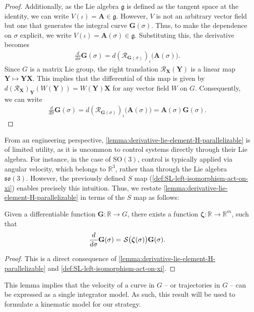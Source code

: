 \begin{proof}
    Additionally, as the Lie algebra $\mathfrak{g}$ is defined as the tangent space at the identity, we can write $V(\iota) = \mathbf{A} \in \mathfrak{g}$. However, $V$ is not an arbitrary vector field but one that generates the integral curve $\mathbf{G}(\sigma)$. Thus, to make the dependence on $\sigma$ explicit, we write $V(\iota) = \mathbf{A}(\sigma) \in \mathfrak{g}$. Substituting this, the derivative becomes
    \begin{align}
        \frac{d}{d\sigma} \mathbf{G}(\sigma) = d(\mathcal{R}_{\mathbf{G}(\sigma)})_{\iota}\bigl(\mathbf{A}(\sigma)\bigr).
    \end{align}
    Since $G$ is a matrix Lie group, the right translation $\mathcal{R}_\mathbf{X}(\mathbf{Y})$ is a linear map $\mathbf{Y}\mapsto \mathbf{Y}\mathbf{X}$. This implies that the differential of this map is given by $d(\mathcal{R}_\mathbf{X})_{\mathbf{Y}}(W(\mathbf{Y})) = W(\mathbf{Y})\mathbf{X}$ \citep[p. 194]{Lee2012} for any vector field $W$ on $G$. Consequently, we can write
    \begin{align}
        \frac{d}{d\sigma} \mathbf{G}(\sigma) = d(\mathcal{R}_{\mathbf{G}(\sigma)})_{\iota}\bigl(\mathbf{A}(\sigma)\bigr) = \mathbf{A}(\sigma)\mathbf{G}(\sigma).
    \end{align}
\end{proof}

From an engineering perspective, \cref{lemma:derivative-lie-element-H-parallelizable} is of limited utility, as it is uncommon to control systems directly through their Lie algebra. For instance, in the case of $\text{SO}(3)$, control is typically applied via angular velocity, which belongs to $\mathbb{R}^3$, rather than through the Lie algebra $\mathfrak{so}(3)$. However, the previously defined $S$ map (\cref{def:SL-left-isomorphism-act-on-xi}) enables precisely this intuition. Thus, we restate \cref{lemma:derivative-lie-element-H-parallelizable} in terms of the $S$ map as follows:
\begin{lemma} \label{lemma:very-important-fact}
    Given a differentiable function $\mathbf{\mathbf{G}}:\mathbb{R}\to G$, there exists a function $\boldsymbol{\zeta}:\mathbb{R}\to\mathbb{R}^m$, such that
    \begin{align}
    \label{eq:importantresult}
    \frac{d}{d\sigma} \mathbf{\mathbf{G}}(\sigma)=\SL\bigl(\boldsymbol{\zeta}(\sigma)\bigr)\mathbf{\mathbf{G}}(\sigma). 
\end{align}
\end{lemma}
\begin{proof} This is a direct consequence of \cref{lemma:derivative-lie-element-H-parallelizable} and \cref{def:SL-left-isomorphism-act-on-xi}. 
\end{proof}
This lemma implies that the velocity of a curve in $G$ -- or trajectories in $G$ -- can be expressed as a single integrator model. As such, this result will be used to formulate a kinematic model for our strategy.
